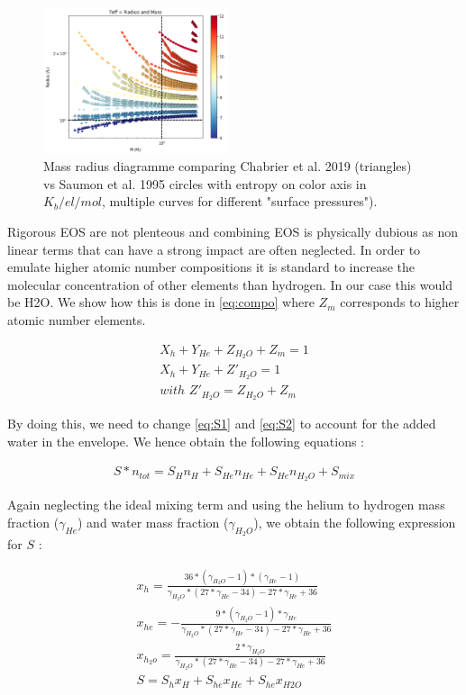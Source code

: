 \begin{figure}
    \centering
    \includegraphics[width=0.48\textwidth]{Images/M-R_benchmark.png}
    \caption{Mass radius diagramme comparing Chabrier et al. 2019 (triangles) vs Saumon et al. 1995 circles with entropy on color axis in $K_b/el/mol$, multiple curves for different "surface pressures").}
    \label{fig:M-R_benchmark}
\end{figure}

Rigorous EOS are not plenteous and combining EOS is physically dubious as non linear terms that can have a strong impact are often neglected. In order to emulate higher atomic number compositions it is standard to increase the molecular concentration of other elements than hydrogen. In our case this would be H2O. We show how this is done in \cref{eq:compo} where $Z_m$ corresponds to higher atomic number elements.

\begin{align}
    \label{eq:compo}
    X_h + Y_{He} + Z_{H_2O} + Z_m = 1 \nonumber \\
    X_h + Y_{He} + Z'_{H_2O} = 1 \\ 
    with \,\,  Z'_{H_2O} = Z_{H_2O} + Z_m \nonumber 
\end{align}

By doing this, we need to change \cref{eq:S1} and \cref{eq:S2} to account for the added water in the envelope. We hence obtain the following equations :

\begin{align}
    S*n_{tot} = S_{H}n_{H} + S_{He}n_{He} + S_{He}n_{H_2O} + S_{mix}\label{eq:S3}
\end{align}

Again neglecting the ideal mixing term and using the helium to hydrogen mass fraction ($\gamma_{He}$) and water mass fraction ($\gamma_{H_2O}$), we obtain the following expression for $S$ :

\begin{align}
    x_{h} = \frac{36*(\gamma_{H_2O}-1)*(\gamma_{He}-1)}{\gamma_{H_2O}*(27*\gamma_{He}-34)-27*\gamma_{He}+36} \nonumber \\
    x_{he} = -\frac{9*(\gamma_{H_2O}-1)*\gamma_{He}}{\gamma_{H_2O}*(27*\gamma_{He}-34)-27*\gamma_{He}+36} \nonumber \\
    x_{h_2o} = \frac{2*\gamma_{H_2O}}{\gamma_{H_2O}*(27*\gamma_{He}-34)-27*\gamma_{He}+36} \nonumber \\
    S = S_{h}x_{H} + S_{he}x_{He} + S_{he}x_{H2O} \label{eq:S4}
\end{align}

